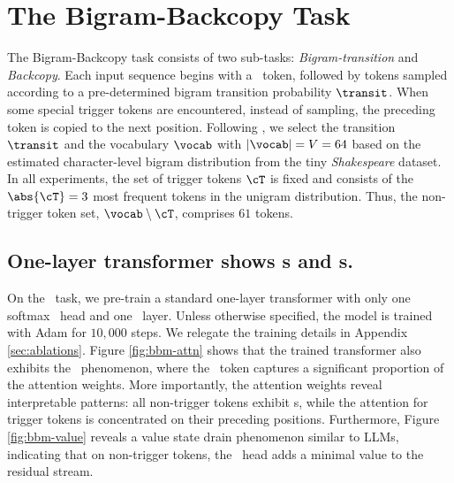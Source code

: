 \section{The Bigram-Backcopy Task}\label{sec:bb_task}
The Bigram-Backcopy task consists of two sub-tasks: \textit{Bigram-transition} and \textit{Backcopy}. Each input sequence begins with a \bos~token, followed by tokens sampled according to a pre-determined bigram transition probability $\transit$. When some special trigger tokens are encountered, instead of sampling, the preceding token is copied to the next position. Following \citet{bietti2024birth}, we select the transition $\transit$ and the vocabulary $\vocab$ with $| \vocab | = V = 64$ based on the estimated character-level bigram distribution from the tiny \textit{Shakespeare} dataset. In all experiments, the set of trigger tokens $\cT$ is fixed and consists of the $\abs{\cT}=3$ most frequent tokens in the unigram distribution. Thus, the non-trigger token set, $\vocab\setminus \cT$, comprises $61$ tokens.

\subsection{One-layer transformer shows \attnsink s and  s.}

On the \bb~task, we pre-train a standard one-layer transformer with only one softmax \attn~head and one \mlp~layer. Unless otherwise specified, the model is trained with Adam for $10,000$ steps.  We relegate the training details in Appendix \ref{sec:ablations}. Figure \ref{fig:bbm-attn} shows that the trained transformer also exhibits the \attnsink~phenomenon, where the \bos~token captures a significant proportion of the attention weights. More importantly, the attention weights reveal interpretable patterns: all non-trigger tokens exhibit \attnsink s, while the attention for trigger tokens is concentrated on their preceding positions. Furthermore, Figure \ref{fig:bbm-value} reveals a value state drain phenomenon similar to LLMs, indicating that on non-trigger tokens, the \attn~head adds a minimal value to the residual stream. 

